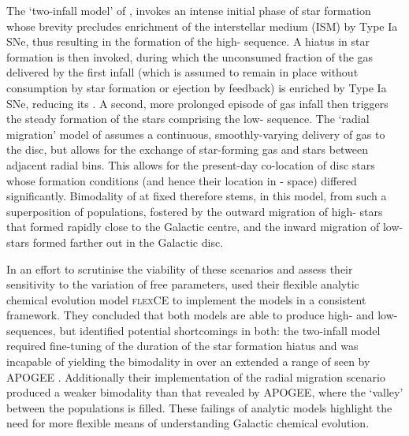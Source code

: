 The `two-infall model' of \citet{1997ApJ...477..765C,2001ApJ...554.1044C}, invokes an intense initial phase of star formation whose brevity precludes enrichment of the interstellar medium (ISM) by Type Ia SNe, thus resulting in the formation of the high-\afe{} sequence. A hiatus in star formation is then invoked, during which the unconsumed fraction of the gas delivered by the first infall (which is assumed to remain in place without consumption by star formation or ejection by feedback) is enriched by Type Ia SNe, reducing its \afe{}. A second, more prolonged episode of gas infall then triggers the steady formation of the stars comprising the low-\afe{} sequence. The `radial migration' model of \citet{2009MNRAS.396..203S} assumes a continuous, smoothly-varying delivery of gas to the disc, but allows for the exchange of star-forming gas and stars between adjacent radial bins. This allows for the present-day co-location of disc stars whose formation conditions (and hence their location in \afe{}-\feh{} space) differed significantly. Bimodality of \afe{} at fixed \feh{} therefore stems, in this model, from such a superposition of populations, fostered by the outward migration of high-\afe{} stars that formed rapidly close to the Galactic centre, and the inward migration of low-\afe{} stars formed farther out in the Galactic disc. 

 In an effort to scrutinise the viability of these scenarios and assess their sensitivity to the variation of free parameters, \citet{2016arXiv160408613A} used their flexible analytic chemical evolution model \textsc{flexCE} to implement the models in a consistent framework. They concluded that both models are able to produce high- and low-\afe{} sequences, but identified potential shortcomings in both: the two-infall model required fine-tuning of the duration of the star formation hiatus and was incapable of yielding the bimodality in \afe{} over an extended a range of \feh{} seen by APOGEE \citep[seen in, e.g.][]{2014ApJ...796...38N,2015ApJ...808..132H}. Additionally their implementation of the radial migration scenario produced a weaker bimodality than that revealed by APOGEE, where the `valley' between the populations is filled. These failings of analytic models highlight the need for more flexible means of understanding Galactic chemical evolution.
 
